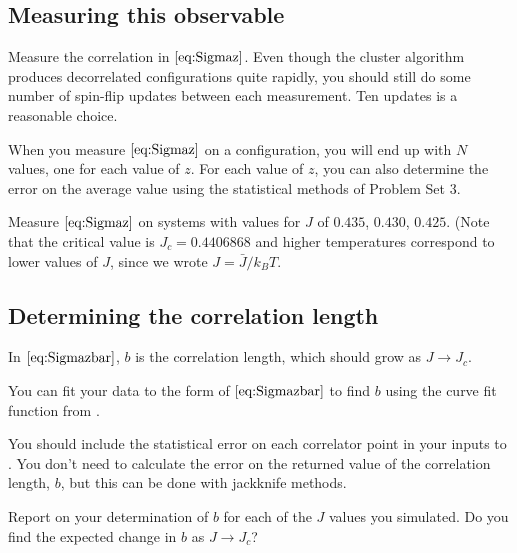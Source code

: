 \subsection{Measuring this observable}

Measure the correlation in \(\eqref{eq:Sigmaz}\). Even
though the cluster algorithm produces decorrelated configurations quite rapidly, you should
still do some number of spin-flip updates between each measurement. Ten updates is a
reasonable choice.

When you measure \(\eqref{eq:Sigmaz}\) on a configuration, you will end up with \(N\)
values, one for each value of \(z\). For each value of \(z\), you can also determine the
error on the average value using the statistical methods of Problem Set 3.

\Question{} Measure \(\eqref{eq:Sigmaz}\) on systems with values for \(J\) of \(0.435\),
\(0.430\), \(0.425\). (Note that the critical value is \(J_c = 0.4406868\) and higher
temperatures correspond to lower values of \(J\), since we wrote \(J = \bar{J} / k_B T\).

\subsection{Determining the correlation length}

In \(\eqref{eq:Sigmazbar}\), \(b\) is the correlation length, which should grow as
\(J \rightarrow J_c\).

\Question{} You can fit your data to the form of \(\eqref{eq:Sigmazbar}\) to find \(b\)
using the curve fit function  from
\href{https://github.com/JuliaNLSolvers/LsqFit.jl}{}.

You should include the statistical error on each correlator point in your inputs to
.
You don't need to calculate the error on the returned value of the correlation length,
\(b\), but this can be done with jackknife methods.


\Question{} Report on your determination of \(b\) for each of the \(J\) values you
simulated. Do you find the expected change in \(b\) as \(J \rightarrow J_c\)?
